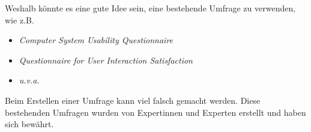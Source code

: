 \begin{exercise}
  Weshalb könnte es eine gute Idee sein, eine bestehende Umfrage zu verwenden, wie z.B.
  \begin{itemize}
    \item {\textit{Computer System Usability Questionnaire}}
    \item {\textit{Questionnaire for User Interaction Satisfaction}}
    \item {\textit{u.v.a.}}
  \end{itemize}
  \vspace{0.5cm}
\end{exercise}
Beim Erstellen einer Umfrage kann viel falsch gemacht werden.
Diese bestehenden Umfragen wurden von Expertinnen und Experten erstellt und haben sich bewährt.